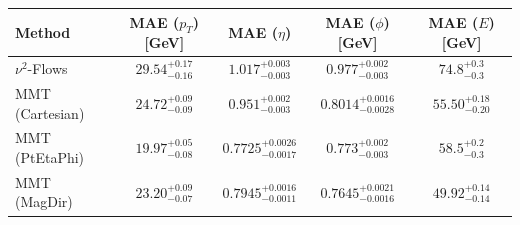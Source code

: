     \begin{tabular}{lcccc}
        \toprule
        Method & MAE ($p_T$) [GeV] & MAE ($\eta$) & MAE ($\phi$) [GeV] & MAE ($E$) [GeV] \\
        \midrule
        $\nu^2$-Flows & $29.54^{+0.17}_{-0.16}$ & $1.017^{+0.003}_{-0.003}$ & $0.977^{+0.002}_{-0.003}$ & $74.8^{+0.3}_{-0.3}$ \\
        MMT (Cartesian) & $24.72^{+0.09}_{-0.09}$ & $0.951^{+0.002}_{-0.003}$ & $0.8014^{+0.0016}_{-0.0028}$ & $55.50^{+0.18}_{-0.20}$ \\
        MMT (PtEtaPhi) & $19.97^{+0.05}_{-0.08}$ & $0.7725^{+0.0026}_{-0.0017}$ & $0.773^{+0.002}_{-0.003}$ & $58.5^{+0.2}_{-0.3}$ \\
        MMT (MagDir) & $23.20^{+0.09}_{-0.07}$ & $0.7945^{+0.0016}_{-0.0011}$ & $0.7645^{+0.0021}_{-0.0016}$ & $49.92^{+0.14}_{-0.14}$ \\
        \bottomrule
    \end{tabular}